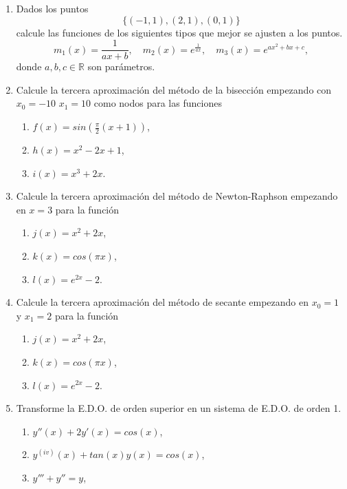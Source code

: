 \documentclass[11pt]{article}
\begin{document}
\begin{enumerate}
\item Dados los puntos 
$$
\{(-1,1),(2,1),(0,1)\}
$$
calcule las funciones de los siguientes tipos que mejor se ajusten a los puntos.
$$
m_1(x)=\frac{1}{ax+b}, \quad 
m_2(x)=e^{\frac{1}{ax}}, \quad 
m_3(x)=e^{ax^2+bx+c},
$$
donde $a,b,c\in\mathbb{R}$ son par\'ametros.

\item Calcule la tercera aproximaci\'on del m\'etodo de la bisecci\'on empezando con $x_0=-10$ $x_1=10$ como nodos para las funciones
\begin{multicols}{3}
\begin{enumerate}
  \item $f(x)=sin\left(\frac{\pi}{2} (x+1)\right)$, 
  \item $h(x)=x^2-2x+1$,
  \item $i(x)=x^3+2x$.
\end{enumerate}
\end{multicols}
\item Calcule la tercera aproximaci\'on del m\'etodo de Newton-Raphson empezando en $x=3$ para la funci\'on
\begin{multicols}{3}
\begin{enumerate}
  \item $j(x)=x^2+2x$, 
  \item $k(x)=cos(\pi x)$, 
  \item $l(x)=e^{2x}-2$.
\end{enumerate}
\end{multicols}
\item Calcule la tercera aproximaci\'on del m\'etodo de secante empezando en $x_0=1$ y $x_1=2$ para la funci\'on
\begin{multicols}{3}
\begin{enumerate}
  \item $j(x)=x^2+2x$, 
  \item $k(x)=cos(\pi x)$, 
  \item $l(x)=e^{2x}-2$.
\end{enumerate}
\end{multicols}
\item Transforme la E.D.O. de orden superior en un sistema de E.D.O. de orden 1.
\begin{multicols}{2}
\begin{enumerate}
	\item $y''(x)+2y'(x)=cos(x)$, 
    \item $y^{(iv)}(x)+tan(x)y(x)=cos(x)$,
    \item $y'''+y''=y$,

\end{enumerate}
\end{multicols}
\end{enumerate}
\end{document}
